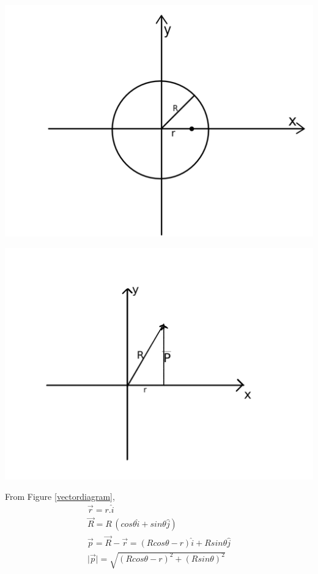 \begin{center}
   \begin{minipage}[b]{0.4\textwidth}
         \includegraphics[width=\textwidth]{fig2}
         \label{ring}
   \end{minipage}
   \hfill
   \begin{minipage}[b]{0.4\textwidth}
         \includegraphics[width=\textwidth]{fig1}
         \label{vectordiagram}
   \end{minipage}
\end{center}

From Figure \ref{vectordiagram}, 
%
\begin{equation}
   \begin{gathered}
      \vec{r} = r.\hat{i}\\
      \vec{R} = R\,(cos \theta \hat{i} + sin \theta \hat{j} )\\
      \vec{p} = \vec{R}-\vec{r} = (R cos \theta-r) \hat{i} + R sin \theta \hat{j}\\
      \vert \vec{p}\vert = \sqrt{(R cos \theta - r)^{2} + (R sin \theta )^{2} }
   \end{gathered}
\end{equation}

